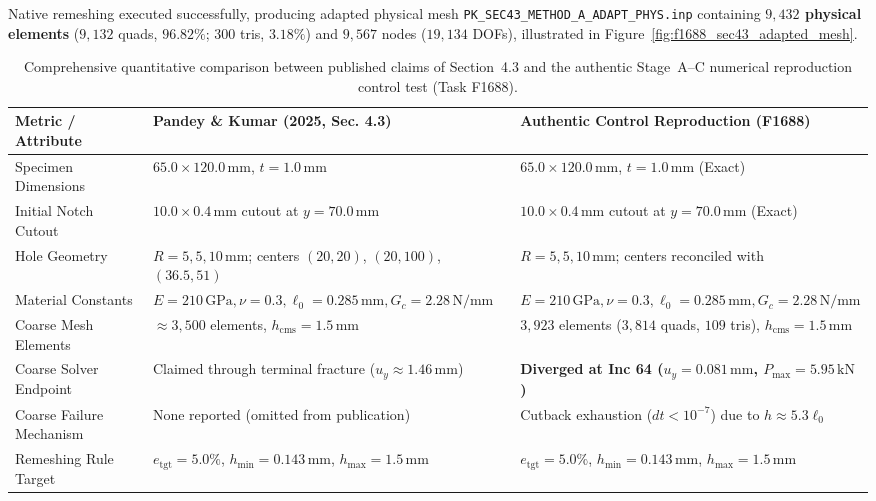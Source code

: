 Native remeshing executed successfully, producing adapted physical mesh \texttt{PK\_SEC43\_METHOD\_A\_ADAPT\_PHYS.inp} containing \textbf{$9{,}432$ physical elements} ($9{,}132$ quads, $96.82\%$; $300$ tris, $3.18\%$) and $9{,}567$ nodes ($19{,}134$ DOFs), illustrated in Figure~\ref{fig:f1688_sec43_adapted_mesh}.

\begin{table}[htbp]
\centering
\footnotesize
\renewcommand{\arraystretch}{0.86}
\setlength{\tabcolsep}{3.5pt}
\caption{Comprehensive quantitative comparison between published claims of \citet{pandey2025} Section~4.3 and the authentic Stage~A--C numerical reproduction control test (Task F1688).}
\label{tab:f1688_sec43_comparison}
\begin{tabularx}{\textwidth}{lXX}
\hline
\textbf{Metric / Attribute} & \textbf{Pandey \& Kumar (2025, Sec. 4.3)} & \textbf{Authentic Control Reproduction (F1688)} \\
\hline
Specimen Dimensions & $65.0 \times 120.0\,\mathrm{mm}$, $t = 1.0\,\mathrm{mm}$ & $65.0 \times 120.0\,\mathrm{mm}$, $t = 1.0\,\mathrm{mm}$ (Exact) \\
Initial Notch Cutout & $10.0 \times 0.4\,\mathrm{mm}$ cutout at $y = 70.0\,\mathrm{mm}$ & $10.0 \times 0.4\,\mathrm{mm}$ cutout at $y = 70.0\,\mathrm{mm}$ (Exact) \\
Hole Geometry & $R = 5, 5, 10\,\mathrm{mm}$; centers $(20, 20)$, $(20, 100)$, $(36.5, 51)$ & $R = 5, 5, 10\,\mathrm{mm}$; centers reconciled with \citet{ambati2015} \\
Material Constants & $E = 210\,\mathrm{GPa}, \nu = 0.3, \ell_0 = 0.285\,\mathrm{mm}, G_c = 2.28\,\mathrm{N/mm}$ & $E = 210\,\mathrm{GPa}, \nu = 0.3, \ell_0 = 0.285\,\mathrm{mm}, G_c = 2.28\,\mathrm{N/mm}$ \\
Coarse Mesh Elements & $\approx 3{,}500$ elements, $h_{\mathrm{cms}} = 1.5\,\mathrm{mm}$ & $3{,}923$ elements ($3{,}814$ quads, $109$ tris), $h_{\mathrm{cms}} = 1.5\,\mathrm{mm}$ \\
Coarse Solver Endpoint & Claimed through terminal fracture ($u_y \approx 1.46\,\mathrm{mm}$) & \textbf{Diverged at Inc 64 ($u_y = 0.081\,\mathrm{mm}$, $P_{\max} = 5.95\,\mathrm{kN}$)} \\
Coarse Failure Mechanism & None reported (omitted from publication) & Cutback exhaustion ($dt < 10^{-7}$) due to $h \approx 5.3\ell_0$ \\
Remeshing Rule Target & $e_{\mathrm{tgt}} = 5.0\%$, $h_{\min} = 0.143\,\mathrm{mm}$, $h_{\max} = 1.5\,\mathrm{mm}$ & $e_{\mathrm{tgt}} = 5.0\%$, $h_{\min} = 0.143\,\mathrm{mm}$, $h_{\max} = 1.5\,\mathrm{mm}$ \\

\end{tabularx}
\end{table}
